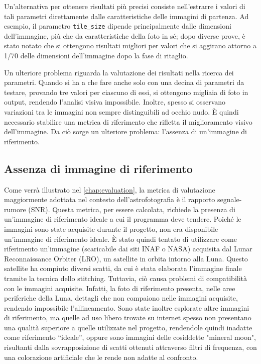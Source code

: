 Un'alternativa per ottenere risultati più precisi consiste nell'estrarre i valori di tali parametri direttamente dalle caratteristiche delle immagini di partenza. Ad esempio, il parametro \texttt{tile\_size} dipende principalmente dalle dimensioni dell'immagine, più che da caratteristiche della foto in sé; dopo diverse prove, è stato notato che si ottengono risultati migliori per valori che si aggirano attorno a 1/70 delle dimensioni dell'immagine dopo la fase di ritaglio.

Un ulteriore problema riguarda la valutazione dei risultati nella ricerca dei parametri. Quando si ha a che fare anche solo con una decina di parametri da testare, provando tre valori per ciascuno di essi, si ottengono migliaia di foto in output, rendendo l'analisi visiva impossibile. Inoltre, spesso si osservano variazioni tra le immagini non sempre distinguibili ad occhio nudo. È quindi necessario stabilire una metrica di riferimento che rifletta il miglioramento visivo dell'immagine. Da ciò sorge un ulteriore problema: l'assenza di un'immagine di riferimento.

\subsection{Assenza di immagine di riferimento}

Come verrà illustrato nel \cref{chap:evaluation}, la metrica di valutazione maggiormente adottata nel contesto dell'astrofotografia è il rapporto segnale-rumore (SNR). Questa metrica, per essere calcolata, richiede la presenza di un'immagine di riferimento ideale a cui il programma deve tendere. Poiché le immagini sono state acquisite durante il progetto, non era disponibile un'immagine di riferimento ideale. È stato quindi tentato di utilizzare come riferimento un'immagine (scaricabile dai siti INAF o NASA) acquisita dal Lunar Reconnaissance Orbiter (LRO), un satellite in orbita intorno alla Luna. Questo satellite ha compiuto diversi scatti, da cui è stata elaborata l’immagine finale tramite la tecnica dello stitching. Tuttavia, ciò causa problemi di compatibilità con le immagini acquisite. Infatti, la foto di riferimento presenta, nelle aree periferiche della Luna, dettagli che non compaiono nelle immagini acquisite, rendendo impossibile l'allineamento. Sono state inoltre esplorate altre immagini di riferimento, ma quelle ad uso libero trovate su internet spesso non presentano una qualità superiore a quelle utilizzate nel progetto, rendendole quindi inadatte come riferimento “ideale”, oppure sono immagini delle cosiddette "mineral moon", risultanti dalla sovrapposizione di scatti ottenuti attraverso filtri di frequenza, con una colorazione artificiale che le rende non adatte al confronto.

